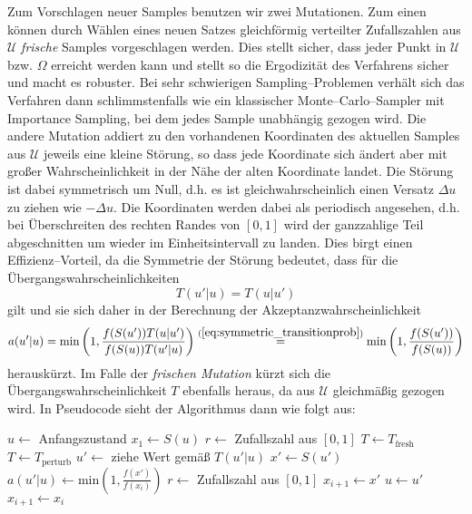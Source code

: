 	Zum Vorschlagen neuer Samples benutzen wir zwei Mutationen. Zum einen können durch Wählen eines neuen Satzes gleichförmig verteilter Zufallszahlen aus $\mathcal{U}$ {\em frische} Samples vorgeschlagen werden. Dies stellt sicher, dass jeder Punkt in $\mathcal{U}$ bzw. $\Omega$ erreicht werden kann und stellt so die Ergodizität des Verfahrens sicher und macht es robuster. Bei sehr schwierigen Sampling--Problemen verhält sich das Verfahren dann schlimmstenfalls wie ein klassischer Monte--Carlo--Sampler mit Importance Sampling, bei dem jedes Sample unabhängig gezogen wird.
	Die andere Mutation addiert zu den vorhandenen Koordinaten des aktuellen Samples aus $\mathcal{U}$ jeweils eine kleine Störung, so dass jede Koordinate sich ändert aber mit großer Wahrscheinlichkeit in der Nähe der alten Koordinate landet. Die Störung ist dabei symmetrisch um Null, d.h. es ist gleichwahrscheinlich einen Versatz $\Delta u$ zu ziehen wie $-\Delta u$. Die Koordinaten werden dabei als periodisch angesehen, d.h. bei Überschreiten des rechten Randes von $[0,1]$ wird der ganzzahlige Teil abgeschnitten um wieder im Einheitsintervall zu landen. Dies birgt einen Effizienz--Vorteil, da die Symmetrie der Störung bedeutet, dass für die Übergangswahrscheinlichkeiten
	\begin{equation}
	  T(u'|u)=T(u|u')
	  \label{eq:symmetric_transitionprob}
	\end{equation}
	gilt und sie sich daher in der Berechnung der Akzeptanzwahrscheinlichkeit
	$$a(u'|u)=\text{min}\left(1,\frac{f(S(u'))T(u|u')}{f(S(u))T(u'|u)}\right)\stackrel{(\ref{eq:symmetric_transitionprob})}{=}\text{min}\left(1,\frac{f(S(u'))}{f(S(u))}\right)$$
	herauskürzt. Im Falle der {\em frischen Mutation} kürzt sich die Übergangswahrscheinlichkeit $T$ ebenfalls heraus, da aus $\mathcal{U}$ gleichmäßig gezogen wird.
	In Pseudocode sieht der Algorithmus dann wie folgt aus:
	\begin{algorithmic}
		\STATE $u \leftarrow$ Anfangszustand
		\STATE $x_1 \leftarrow S(u)$
			\STATE $r\leftarrow$ Zufallszahl aus $[0,1]$
						\STATE $T \leftarrow T_\text{fresh}$
				\STATE $T \leftarrow T_\text{perturb}$
			\ENDIF
			\STATE $u'\leftarrow$ ziehe Wert gemäß $T(u'|u)$
			\STATE $x' \leftarrow S(u')$
			\STATE $a(u'|u) \leftarrow \text{min}\left(1,\frac{f(x')}{f(x_i)}\right)$
			\STATE $r\leftarrow$ Zufallszahl aus $[0,1]$
			  \STATE $x_{i+1} \leftarrow x'$
			  \STATE $u \leftarrow u'$
			\ELSE	\STATE $x_{i+1} \leftarrow x_i$
			\ENDIF
	  \ENDFOR
	\end{algorithmic}

